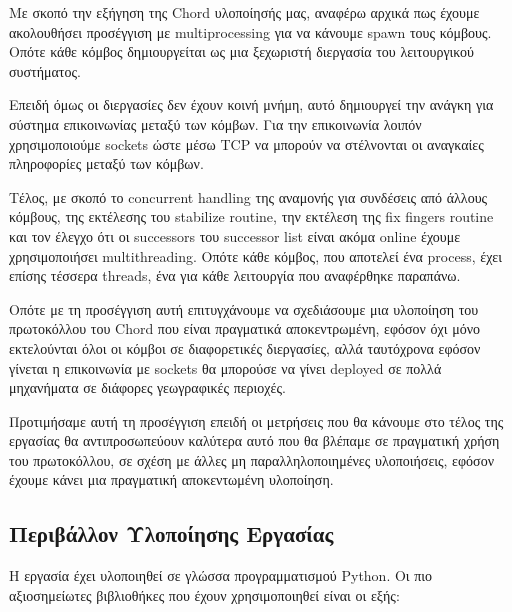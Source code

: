 \documentclass[12pt,a4paper]{article}
\begin{document}
Με σκοπό την εξήγηση της Chord υλοποίησής μας, αναφέρω αρχικά πως έχουμε ακολουθήσει προσέγγιση με multiprocessing για να κάνουμε spawn τους κόμβους. Οπότε κάθε κόμβος δημιουργείται ως μια ξεχωριστή διεργασία του λειτουργικού συστήματος.

Επειδή όμως οι διεργασίες δεν έχουν κοινή μνήμη, αυτό δημιουργεί την ανάγκη για σύστημα επικοινωνίας μεταξύ των κόμβων. Για την επικοινωνία λοιπόν χρησιμοποιούμε sockets ώστε μέσω TCP να μπορούν να στέλνονται οι αναγκαίες πληροφορίες μεταξύ των κόμβων.

Τέλος, με σκοπό το concurrent handling της αναμονής για συνδέσεις από άλλους κόμβους, της εκτέλεσης του stabilize routine, την εκτέλεση της fix fingers routine και τον έλεγχο ότι οι successors του successor list είναι ακόμα online έχουμε χρησιμοποιήσει multithreading. Οπότε κάθε κόμβος, που αποτελεί ένα process, έχει επίσης τέσσερα threads, ένα για κάθε λειτουργία που αναφέρθηκε παραπάνω.

Οπότε με τη προσέγγιση αυτή επιτυγχάνουμε να σχεδιάσουμε μια υλοποίηση του πρωτοκόλλου του Chord που είναι πραγματικά αποκεντρωμένη, εφόσον όχι μόνο εκτελούνται όλοι οι κόμβοι σε διαφορετικές διεργασίες, αλλά ταυτόχρονα εφόσον γίνεται η επικοινωνία με sockets θα μπορούσε να γίνει deployed σε πολλά μηχανήματα σε διάφορες γεωγραφικές περιοχές.

Προτιμήσαμε αυτή τη προσέγγιση επειδή οι μετρήσεις που θα κάνουμε στο τέλος της εργασίας θα αντιπροσωπεύουν καλύτερα αυτό που θα βλέπαμε σε πραγματική χρήση του πρωτοκόλλου, σε σχέση με άλλες μη παραλληλοποιημένες υλοποιήσεις, εφόσον έχουμε κάνει μια πραγματική αποκεντωμένη υλοποίηση.

\subsection{Περιβάλλον Υλοποίησης Εργασίας}

Η εργασία έχει υλοποιηθεί σε γλώσσα προγραμματισμού Python. Οι πιο αξιοσημείωτες βιβλιοθήκες που έχουν χρησιμοποιηθεί είναι οι εξής:
\end{document}
